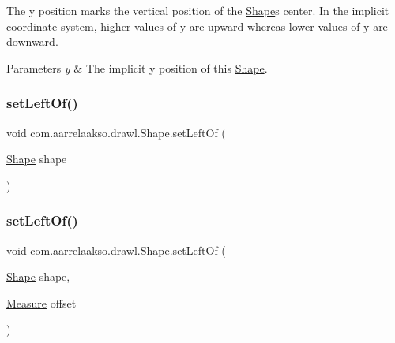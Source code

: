The y position marks the vertical position of the \hyperlink{classcom_1_1aarrelaakso_1_1drawl_1_1_shape}{Shape}\textquotesingle{}s center. In the implicit coordinate system, higher values of y are upward whereas lower values of y are downward.


\begin{DoxyParams}{Parameters}
{\em y} & The implicit y position of this \hyperlink{classcom_1_1aarrelaakso_1_1drawl_1_1_shape}{Shape}. \\
\hline
\end{DoxyParams}
\mbox{\label{classcom_1_1aarrelaakso_1_1drawl_1_1_shape_aad14fa860ab74cfa90815f56cf4c3ecf}} 
\subsubsection{\texorpdfstring{set\+Left\+Of()}{setLeftOf()}\hspace{0.1cm}{\footnotesize\ttfamily [1/2]}}
{\footnotesize\ttfamily void com.\+aarrelaakso.\+drawl.\+Shape.\+set\+Left\+Of (\begin{DoxyParamCaption}\item[{\hyperlink{classcom_1_1aarrelaakso_1_1drawl_1_1_shape}{Shape}}]{shape }\end{DoxyParamCaption})\hspace{0.3cm}{\ttfamily [inherited]}}

\mbox{\label{classcom_1_1aarrelaakso_1_1drawl_1_1_shape_aa1f77ee3e24986329b3618b76b2d12be}} 
\subsubsection{\texorpdfstring{set\+Left\+Of()}{setLeftOf()}\hspace{0.1cm}{\footnotesize\ttfamily [2/2]}}
{\footnotesize\ttfamily void com.\+aarrelaakso.\+drawl.\+Shape.\+set\+Left\+Of (\begin{DoxyParamCaption}\item[{\hyperlink{classcom_1_1aarrelaakso_1_1drawl_1_1_shape}{Shape}}]{shape,  }\item[{\hyperlink{classcom_1_1aarrelaakso_1_1drawl_1_1_measure}{Measure}}]{offset }\end{DoxyParamCaption})\hspace{0.3cm}{\ttfamily [inherited]}}




